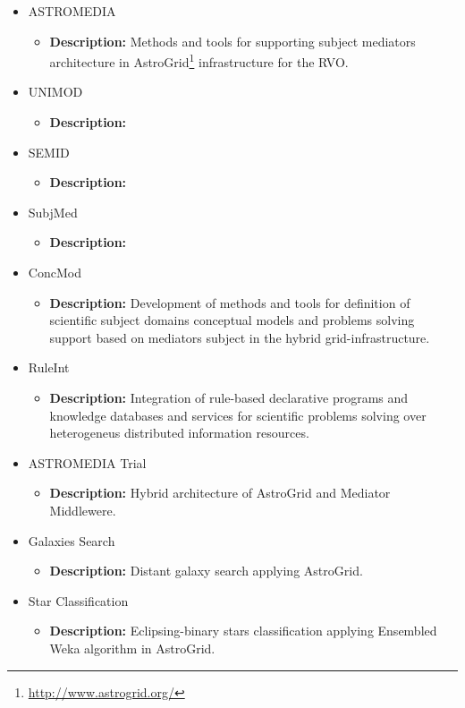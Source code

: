 \begin{itemize}
\begin{itemize}
\begin{itemize}
			\end{itemize}
		\item ASTROMEDIA
			\begin{itemize}
				\item \textbf{Description:} Methods and tools for supporting
subject mediators architecture in
AstroGrid\footnote{\url{http://www.astrogrid.org/}} infrastructure for the RVO.
			\end{itemize}
		\item UNIMOD
			\begin{itemize}
				\item \textbf{Description:}
			\end{itemize}
		\item SEMID
			\begin{itemize}
				\item \textbf{Description:}
			\end{itemize}
		\item SubjMed
			\begin{itemize}
				\item \textbf{Description:}
			\end{itemize}
		\item ConcMod
			\begin{itemize}
				\item \textbf{Description:} Development of methods and tools
for definition of scientific subject domains conceptual models and problems
solving support based on mediators subject in the hybrid grid-infrastructure.
			\end{itemize}
		\item RuleInt
			\begin{itemize}
				\item \textbf{Description:} Integration of rule-based
declarative programs and knowledge databases and services for scientific
problems solving over heterogeneus distributed information resources.
			\end{itemize}
		\item ASTROMEDIA Trial
			\begin{itemize}
				\item \textbf{Description:} Hybrid architecture of AstroGrid
and Mediator Middlewere.
			\end{itemize}
		\item Galaxies Search
			\begin{itemize}
				\item \textbf{Description:} Distant galaxy search applying
AstroGrid.
			\end{itemize}
		\item Star Classification
			\begin{itemize}
				\item \textbf{Description:} Eclipsing-binary stars
classification applying Ensembled Weka algorithm in AstroGrid.
			\end{itemize}
	\end{itemize}
\end{itemize}

